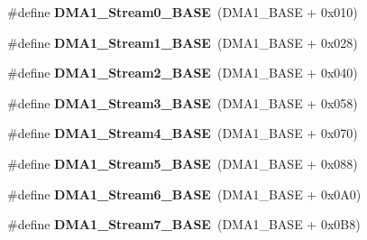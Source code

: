 \begin{DoxyCompactItemize}
\item 
\hypertarget{group___peripheral__memory__map_ga0d3c52aa35dcc68f78b704dfde57ba95}{\#define {\bfseries D\-M\-A1\-\_\-\-Stream0\-\_\-\-B\-A\-S\-E}~(D\-M\-A1\-\_\-\-B\-A\-S\-E + 0x010)}\label{group___peripheral__memory__map_ga0d3c52aa35dcc68f78b704dfde57ba95}

\item 
\hypertarget{group___peripheral__memory__map_ga5b4152cef577e37eccc9311d8bdbf3c2}{\#define {\bfseries D\-M\-A1\-\_\-\-Stream1\-\_\-\-B\-A\-S\-E}~(D\-M\-A1\-\_\-\-B\-A\-S\-E + 0x028)}\label{group___peripheral__memory__map_ga5b4152cef577e37eccc9311d8bdbf3c2}

\item 
\hypertarget{group___peripheral__memory__map_ga48a551ee91d3f07dd74347fdb35c703d}{\#define {\bfseries D\-M\-A1\-\_\-\-Stream2\-\_\-\-B\-A\-S\-E}~(D\-M\-A1\-\_\-\-B\-A\-S\-E + 0x040)}\label{group___peripheral__memory__map_ga48a551ee91d3f07dd74347fdb35c703d}

\item 
\hypertarget{group___peripheral__memory__map_gac51deb54ff7cfe1290dfcf517ae67127}{\#define {\bfseries D\-M\-A1\-\_\-\-Stream3\-\_\-\-B\-A\-S\-E}~(D\-M\-A1\-\_\-\-B\-A\-S\-E + 0x058)}\label{group___peripheral__memory__map_gac51deb54ff7cfe1290dfcf517ae67127}

\item 
\hypertarget{group___peripheral__memory__map_ga757a3c0d866c0fe68c6176156065a26b}{\#define {\bfseries D\-M\-A1\-\_\-\-Stream4\-\_\-\-B\-A\-S\-E}~(D\-M\-A1\-\_\-\-B\-A\-S\-E + 0x070)}\label{group___peripheral__memory__map_ga757a3c0d866c0fe68c6176156065a26b}

\item 
\hypertarget{group___peripheral__memory__map_ga0ded7bed8969fe2e2d616e7f90eb7654}{\#define {\bfseries D\-M\-A1\-\_\-\-Stream5\-\_\-\-B\-A\-S\-E}~(D\-M\-A1\-\_\-\-B\-A\-S\-E + 0x088)}\label{group___peripheral__memory__map_ga0ded7bed8969fe2e2d616e7f90eb7654}

\item 
\hypertarget{group___peripheral__memory__map_ga58998ddc40adb6361704d6c9dad08125}{\#define {\bfseries D\-M\-A1\-\_\-\-Stream6\-\_\-\-B\-A\-S\-E}~(D\-M\-A1\-\_\-\-B\-A\-S\-E + 0x0\-A0)}\label{group___peripheral__memory__map_ga58998ddc40adb6361704d6c9dad08125}

\item 
\hypertarget{group___peripheral__memory__map_ga82186dd6d3f60995d428b34c041919d7}{\#define {\bfseries D\-M\-A1\-\_\-\-Stream7\-\_\-\-B\-A\-S\-E}~(D\-M\-A1\-\_\-\-B\-A\-S\-E + 0x0\-B8)}\label{group___peripheral__memory__map_ga82186dd6d3f60995d428b34c041919d7}


\end{DoxyCompactItemize}
